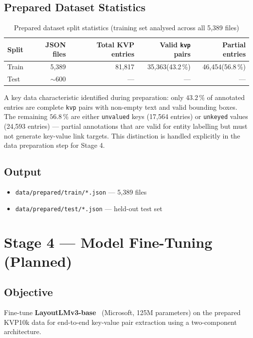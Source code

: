 \documentclass[11pt,a4paper]{article}
\begin{document}
\subsection*{Prepared Dataset Statistics}

\begin{table}[h!]
  \centering
  \caption{Prepared dataset split statistics (training set analysed across all 5{,}389 files)}
  \label{tab:prepared}
  \begin{tabular}{lrrrr}
    \toprule
    \textbf{Split} & \textbf{JSON files} & \textbf{Total KVP entries}
    & \textbf{Valid \texttt{kvp} pairs} & \textbf{Partial entries} \\
    \midrule
    Train & 5{,}389 & 81{,}817 & 35{,}363\;(43.2\,\%) & 46{,}454\;(56.8\,\%) \\
    Test  & $\sim$600 & --- & --- & --- \\
    \bottomrule
  \end{tabular}
\end{table}

\noindent
A key data characteristic identified during preparation: only $43.2\,\%$
of annotated entries are complete \texttt{kvp} pairs with non-empty text
and valid bounding boxes. The remaining $56.8\,\%$ are either
\texttt{unvalued} keys (17{,}564 entries) or \texttt{unkeyed} values
(24{,}593 entries) --- partial annotations that are valid for entity
labelling but must not generate key-value link targets. This distinction
is handled explicitly in the data preparation step for Stage 4.

\subsection*{Output}
\begin{itemize}[noitemsep]
  \item \texttt{data/prepared/train/*.json} --- 5{,}389 files
  \item \texttt{data/prepared/test/*.json} --- held-out test set
\end{itemize}

\section{Stage 4 --- Model Fine-Tuning (Planned)}
\label{sec:stage4}

\subsection*{Objective}
Fine-tune \textbf{LayoutLMv3-base}~\cite{layoutlmv3} (Microsoft, 125M
parameters) on the prepared KVP10k data for end-to-end key-value pair
extraction using a two-component architecture.
\end{document}
